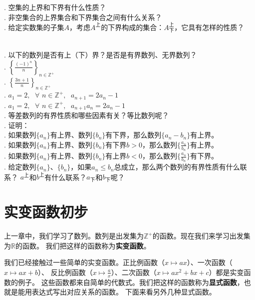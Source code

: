 \documentclass[12pt,UTF8,fontset=none]{ctexbook}
\begin{document}
\begin{sk}
    . 空集的上界和下界有什么性质？\\
    . 非空集合的上界集合和下界集合之间有什么关系？\\
    . 给定实数集的子集$A$，考虑$A^{\text{上}}$的下界构成的集合：$A^{\text{上}}_{\text{下}}$，它具有怎样的性质？
\end{sk}
\begin{xt}
    \mbox{} \\
    . 以下的数列是否有上（下）界？是否是有界数列、无界数列？\\
    . $\left\{\frac{(-1)^n}{n}\right\}_{n\in\mathbb{Z}^+}$ \\
    . $\left\{\frac{3n + 1}{n}\right\}_{n\in\mathbb{Z}^+}$\\
    . $a_1 = 2, \;\,\, \forall \,\, n \in\mathbb{Z}^+, \;\,\, a_{n+1} = 2a_n - 1$\\
    . $a_1 = 2, \;\,\, \forall \,\, n \in\mathbb{Z}^+, \;\,\, a_{n+1}a_n = 2a_n - 1$\\
    . 等差数列的有界性质和哪些因素有关？等比数列呢？\\
    . 证明：\\
    . 如果数列$\{a_n\}$有上界、数列$\{b_n\}$有下界，那么数列$\{a_n - b_n\}$有上界。\\
    . 如果数列$\{a_n\}$有上界、数列$\{b_n\}$有下界$b>0$，那么数列$\{\frac{a_n}{b_n}\}$有上界。\\
    . 如果数列$\{a_n\}$有上界、数列$\{b_n\}$有上界$b<0$，那么数列$\{\frac{a_n}{b_n}\}$有下界。\\
    . 给定数列$\{a_n\}$、$\{b_n\}$，如果$a_n \leqslant b_n$总成立，那么两个数列的有界性质有什么联系？
    $a^{\text{上}}$和$b^{\text{上}}$有什么联系？$a_{\text{下}}$和$b_{\text{下}}$呢？
\end{xt}

\chapter{实变函数初步}

上一章中，我们学习了数列。数列是出发集为$\mathbb{Z}^+$的函数。现在我们来学习出发集为$\mathbb{R}$的函数。
我们把这样的函数称为\textbf{实变函数}。

我们已经接触过一些简单的实变函数。正比例函数（$x\mapsto ax$）、一次函数（$x\mapsto ax + b$）、
反比例函数（$x\mapsto \frac{a}{x}$）、二次函数（$x\mapsto ax^2 + bx + c$）都是实变函数的例子。
这些函数都来自简单的代数式。我们把这样的函数称为\textbf{显式函数}，也就是能用表达式写出对应关系的函数。
下面来看另外几种显式函数。
\end{document}
